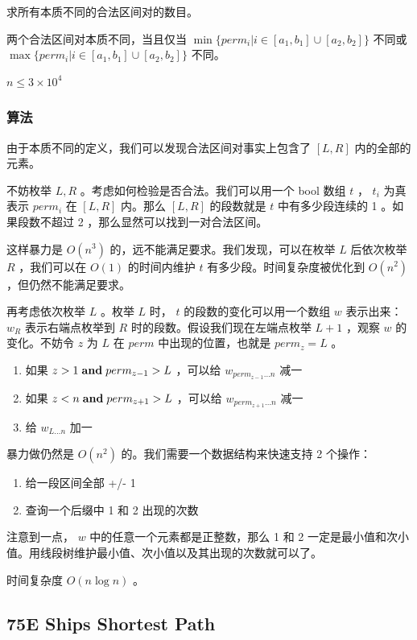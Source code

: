 \documentclass[11pt]{article}
\begin{document}
   求所有本质不同的合法区间对的数目。

   两个合法区间对本质不同，当且仅当 $\min \{perm_i \vert i \in [a_1, b_1] \cup [a_2, b_2]\}$ 不同或 $\max\{perm_i \vert i \in [a_1, b_1] \cup [a_2, b_2] \}$ 不同。

   $n \leq 3 \times 10^4$
\subsubsection{算法}
\label{sec-5-5-2}

    由于本质不同的定义，我们可以发现合法区间对事实上包含了 $[L, R]$ 内的全部的元素。

    不妨枚举 $L, R$ 。考虑如何检验是否合法。我们可以用一个 bool 数组 $t$ ， $t_i$ 为真表示 $perm_i$ 在 $[L, R]$ 内。那么 $[L, R]$ 的段数就是 $t$ 中有多少段连续的 1 。如果段数不超过 2 ，那么显然可以找到一对合法区间。

    这样暴力是 $O(n^3)$ 的，远不能满足要求。我们发现，可以在枚举 $L$ 后依次枚举 $R$ ，我们可以在 $O(1)$ 的时间内维护 $t$ 有多少段。时间复杂度被优化到 $O(n^2)$ ，但仍然不能满足要求。

    再考虑依次枚举 $L$ 。枚举 $L$ 时， $t$ 的段数的变化可以用一个数组 $w$ 表示出来： $w_R$ 表示右端点枚举到 $R$ 时的段数。假设我们现在左端点枚举 $L + 1$ ，观察 $w$ 的变化。不妨令 $z$ 为 $L$ 在 $perm$ 中出现的位置，也就是 $perm_z = L$ 。
\begin{enumerate}
\item 如果 $z > 1 \hspace{0.1cm} \textbf{and} \hspace{0.1cm} perm_{z - 1} > L$ ，可以给 $w_{perm_{z - 1} \dots n}$ 减一
\item 如果 $z < n \hspace{0.1cm} \textbf{and} \hspace{0.1cm} perm_{z + 1} > L$ ，可以给 $w_{perm_{z + 1} \dots n}$ 减一
\item 给 $w_{L \dots n}$ 加一
\end{enumerate}

    暴力做仍然是 $O(n^2)$ 的。我们需要一个数据结构来快速支持 2 个操作：
\begin{enumerate}
\item 给一段区间全部 +/- 1
\item 查询一个后缀中 1 和 2 出现的次数
\end{enumerate}

    注意到一点， $w$ 中的任意一个元素都是正整数，那么 1 和 2 一定是最小值和次小值。用线段树维护最小值、次小值以及其出现的次数就可以了。

    时间复杂度 $O(n \log n)$ 。
\subsection{75E   Ships Shortest Path}
\label{sec-5-6}
\end{document}
